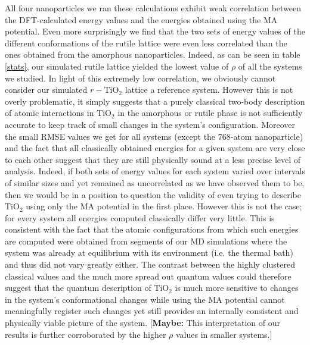 \documentclass[aps,prb,twocolumn,amsmath,amssymb,superscriptaddress,longbibliography]{revtex4-1}
\newcommand\tab[1][1cm]{\hspace*{#1}} %
\begin{document}
\tab All four nanoparticles we ran these calculations exhibit weak correlation between the DFT-calculated energy values and the energies obtained using the MA potential. 
Even more surprisingly we find that the two sets of energy values of the different conformations of the rutile lattice were even less correlated than the ones obtained from the amorphous nanoparticles. 
Indeed, as can be seen in table \ref{stats}, our simulated rutile lattice yielded the lowest value of $\rho$ of all the systems we studied.
In light of this extremely low correlation, we obviously cannot consider our simulated $r-\text{TiO}_2$ lattice a reference system. 
However this is not overly problematic, it simply suggests that a purely classical two-body description of atomic interactions in $\text{TiO}_2$ in the amorphous or rutile phase is not sufficiently accurate to keep track of small changes in the system's configuration.
Moreover the small RMSE values we get for all systems (except the 768-atom nanoparticle) and the fact that all classically obtained energies for a given system are very close to each other suggest that they are still physically sound at a less precise level of analysis.
Indeed, if both sets of energy values for each system varied over intervals of similar sizes and yet remained as uncorrelated as we have observed them to be, then we would be in a position to question the validity of even trying to describe $\text{TiO}_2$ using only the MA potential in the first place.
However this is not the case; for every system all energies computed classically differ very little.
This is consistent with the fact that the atomic configurations from which such energies are computed were obtained from segments of our MD simulations where the system was already at equilibrium with its environment (i.e. the thermal bath) and thus did not vary greatly either.
The contrast between the highly clustered classical values and the much more spread out quantum values could therefore suggest that the quantum description of $\text{TiO}_2$ is much more sensitive to changes in the system's conformational changes while using the MA potential cannot meaningfully register such changes yet still provides an internally consistent and physically viable picture of the system.
[\textbf{Maybe: } This interpretation of our results is further corroborated by the higher $\rho$ values in smaller systems.] 
\end{document}
